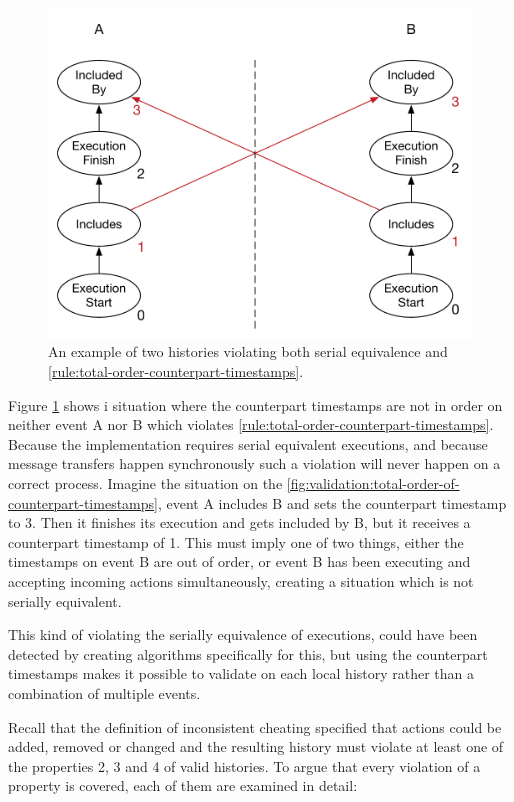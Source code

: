 	\begin{figure}[H]
		\centering
		\includegraphics[width=.5\textwidth]{5validation/images/total-order-of-counterpart-timestamps-cycle.pdf}
		\caption{An example of two histories violating both serial equivalence and \autoref{rule:total-order-counterpart-timestamps}.}
		\label{fig:validation:total-order-of-counterpart-timestamps}
	\end{figure}
	
	\newpar Figure \ref{fig:validation:total-order-of-counterpart-timestamps} shows i situation where the counterpart timestamps are not in order on neither event A nor B which violates \autoref{rule:total-order-counterpart-timestamps}. Because the implementation requires serial equivalent executions, and because message transfers happen synchronously such a violation will never happen on a correct process. Imagine the situation on the \autoref{fig:validation:total-order-of-counterpart-timestamps}, event A includes B and sets the counterpart timestamp to 3. Then it finishes its execution and  gets included by B, but it receives a counterpart timestamp of 1. This must imply one of two things, either the timestamps on event B are out of order, or event B has been executing and accepting incoming actions simultaneously, creating a situation which is not serially equivalent. 
	
	This kind of violating the serially equivalence of executions, could have been detected by creating algorithms specifically for this, but using the counterpart timestamps makes it possible to validate on each local history rather than a combination of multiple events.
	
	\newpar Recall that the definition of inconsistent cheating specified that actions could be added, removed or changed and the resulting history must violate at least one of the properties 2, 3 and 4 of valid histories. To argue that every violation of a property is covered, each of them are examined in detail:
	
	
	
